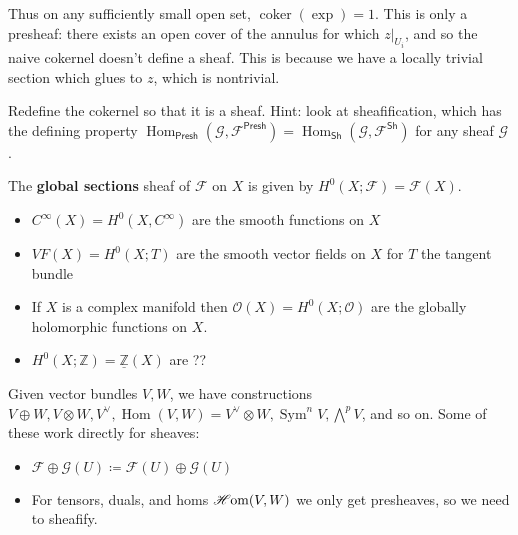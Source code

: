 Thus on any sufficiently small open set,
\(\operatorname{coker}(\exp) = 1\). This is only a presheaf: there
exists an open cover of the annulus for which
\({ \left.{{z}} \right|_{{U_i}} }\), and so the naive cokernel doesn't
define a sheaf. This is because we have a locally trivial section which
glues to \(z\), which is nontrivial.

\begin{exercise}[?]

Redefine the cokernel so that it is a sheaf. Hint: look at
sheafification, which has the defining property
\({\operatorname{Hom}}_{{\mathsf{Presh}}}(\mathcal{G}, \mathcal{F}^{\mathsf{Presh}}) ={\operatorname{Hom}}_{{\mathsf{Sh}}}( \mathcal{G}, \mathcal{F}^{{\mathsf{Sh}}})\)
for any sheaf \(\mathcal{G}\).

\end{exercise}

\begin{definition}

The \textbf{global sections} sheaf of \(\mathcal{F}\) on \(X\) is given
by \(H^0( X; \mathcal{F}) = \mathcal{F}(X)\).

\end{definition}

\begin{example}[?]

\envlist

\begin{itemize}
\tightlist
\item
  \(C^ \infty (X) = H^0(X, C^ \infty )\) are the smooth functions on
  \(X\)
\item
  \(VF(X) = H^0(X; T)\) are the smooth vector fields on \(X\) for \(T\)
  the tangent bundle
\item
  If \(X\) is a complex manifold then
  \({\mathcal{O}}(X) = H^0(X; {\mathcal{O}})\) are the globally
  holomorphic functions on \(X\).
\item
  \(H^0(X; {\mathbb{Z}}) = \underline{{\mathbb{Z}}}(X)\) are ??
\end{itemize}

\end{example}

\begin{remark}

Given vector bundles \(V, W\), we have constructions
\(V \oplus W, V \otimes W, V^\vee, {\operatorname{Hom}}(V, W) = V^\vee\otimes W, \operatorname{Sym}^n V, \bigwedge^p V\),
and so on. Some of these work directly for sheaves:

\begin{itemize}
\tightlist
\item
  \(\mathcal{F} \oplus \mathcal{G}(U) \coloneqq\mathcal{F}(U) \oplus \mathcal{G}(U)\)
\item
  For tensors, duals, and homs
  \(\mathscr{H}\kern-2pt\operatorname{om}(V, W)\) we only get
  presheaves, so we need to sheafify.
\end{itemize}

\end{remark}

